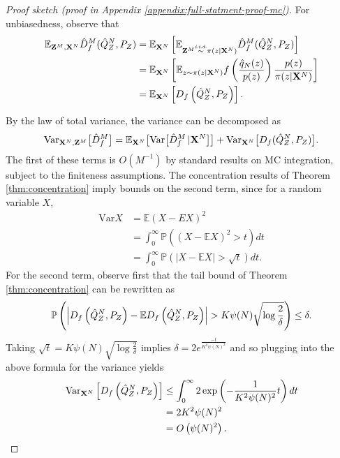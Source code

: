 \begin{proof}[Proof sketch (proof in Appendix \ref{appendix:full-statment-proof-mc})]
For unbiasedness, observe that
\begin{align*}
    \mathbb{E}_{\mathbf{Z}^M, \mathbf{X}^N} \hat{D}^M_f( \hat{Q}_Z^N , P_Z)
    &=\mathbb{E}_{\mathbf{X}^N} \left[ \mathbb{E}_{\mathbf{Z}^M \overset{\text{\emph{i.i.d.}}}{\sim} \pi(z | \mathbf{X}^N)} \hat{D}^M_f( \hat{Q}_Z^N , P_Z)\right] \\
    &= \mathbb{E}_{\mathbf{X}^N} \left[ \mathbb{E}_{z \sim \pi(z | \mathbf{X}^N)} f\left(\frac{\hat{q}_N(z)}{p(z)} \right) \frac{p(z)}{\pi(z|\mathbf{X}^N)} \right] \\
    &=\mathbb{E}_{\mathbf{X}^N} \left[ D_f\left( \hat{Q}^N_Z , P_Z \right)\right].
\end{align*}

By the law of total variance, the variance can be decomposed as
\begin{align*}
    \text{Var}_{\mathbf{X}^N, \mathbf{Z}^M} \bigl[\hat{D}^M_f\bigr] = 
    \mathbb{E}_{\mathbf{X}^N} \bigl[\text{Var}\bigl[\hat{D}^M_f\, | \mathbf{X}^N\bigr]\bigr] + \text{Var}_{\mathbf{X}^N} \bigl[D_f( \hat{Q}_Z^N , P_Z )\bigr].
\end{align*}
The first of these terms is ${O( M^{-1})}$ by standard results on MC integration, subject to the finiteness assumptions.
The concentration results of Theorem \ref{thm:concentration} imply bounds on the second term, since for a random variable $X$,
\begin{align*}
    \text{Var}X &= \mathbb{E} (X - EX)^2 \\
    &= \int_0^\infty \mathbb{P}\left( (X - \mathbb{E} X)^2 > t \right) dt \\
    &= \int_0^\infty \mathbb{P} \left( \left| X - \mathbb{E} X \right| > \sqrt{t} \right) dt.
\end{align*}
For the second term, observe first that the tail bound of Theorem \ref{thm:concentration} can be rewritten as 
\begin{align*}
\mathbb{P}\left(\left|D_f\left( \hat{Q}^N_Z , P_Z \right) - \mathbb{E} D_f\left( \hat{Q}^N_Z , P_Z \right) \right| > K\psi(N) \sqrt{\log \frac{2}{\delta}} \right) \leq \delta.
\end{align*}
Taking $\sqrt{t} = K\psi(N) \sqrt{\log \frac{2}{\delta}}$ implies $\delta = 2 e^{\frac{-t}{K^2 \psi(N)^2}}$ and so plugging into the above formula for the variance yields
\begin{align*}
    \text{Var}_{\mathbf{X}^N} \left[D_f\left( \hat{Q}^N_Z , P_Z \right)\right] 
    &\leq \int_0^\infty 2 \exp\left( -\frac{1}{K^2\psi(N)^2}t \right) dt\\
    &= 2 K^2 \psi(N)^2\\
    &= O\left(\psi(N)^2 \right).
\end{align*}
%
%
\end{proof}

